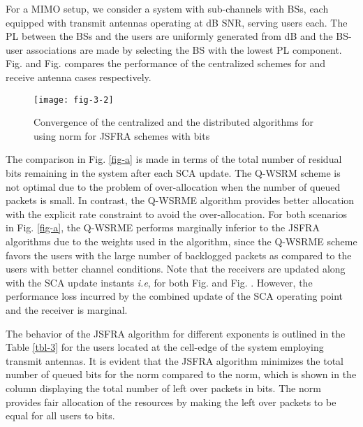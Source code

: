 For a \ac{MIMO} setup, we consider a system with  sub-channels with  \acp{BS}, each equipped with  transmit antennas operating at dB \ac{SNR}, serving  users each. The \ac{PL} between the \acp{BS} and the users are uniformly generated from \me{[0,-3]} dB and the \ac{BS}-user associations are made by selecting the \ac{BS} with the lowest \ac{PL} component. Fig.  and Fig.  compares the performance of the centralized schemes for  and  receive antenna cases respectively.
\begin{figure}
	\centering
	\texttt{[image: fig-3-2]}
	\caption{Convergence of the centralized and the distributed algorithms for  using  norm for \ac{JSFRA} schemes with  bits}
	\label{fig-d}
\end{figure}

The comparison in Fig. \ref{fig-a} is made in terms of the total number of residual bits remaining in the system after each \ac{SCA} update. The \ac{Q-WSRM} scheme is not optimal due to the problem of over-allocation when the number of queued packets is small. In contrast, the \ac{Q-WSRME} algorithm provides better allocation with the explicit rate constraint to avoid the over-allocation. For both scenarios in Fig. \ref{fig-a}, the \ac{Q-WSRME} performs marginally inferior to the \ac{JSFRA} algorithms due to the weights used in the algorithm, since the \ac{Q-WSRME} scheme favors the users with the large number of backlogged packets as compared to the users with better channel conditions. Note that the receivers are updated along with the \ac{SCA} update instants \textit{i.e},  for both Fig.  and Fig. . However, the performance loss incurred by the combined update of the \ac{SCA} operating point and the receiver is marginal.

The behavior of the \ac{JSFRA} algorithm for different exponents  is outlined in the Table \ref{tbl-3} for the users located at the cell-edge of the system employing  transmit antennas. It is evident that the \ac{JSFRA} algorithm minimizes the total number of queued bits for the  norm compared to the  norm, which is shown in the column displaying the total number of left over packets \me{\chi} in bits. The \me{\ell_{\infty}} norm provides fair allocation of the resources by making the left over packets to be equal for all users to  bits.
